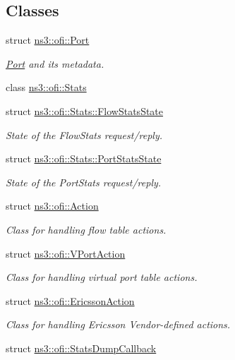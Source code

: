 \subsection*{Classes}
\begin{DoxyCompactItemize}
\item 
struct \hyperlink{structns3_1_1ofi_1_1Port}{ns3\+::ofi\+::\+Port}
\begin{DoxyCompactList}\small\item\em \hyperlink{structns3_1_1ofi_1_1Port}{Port} and its metadata. \end{DoxyCompactList}\item 
class \hyperlink{classns3_1_1ofi_1_1Stats}{ns3\+::ofi\+::\+Stats}
\item 
struct \hyperlink{structns3_1_1ofi_1_1Stats_1_1FlowStatsState}{ns3\+::ofi\+::\+Stats\+::\+Flow\+Stats\+State}
\begin{DoxyCompactList}\small\item\em State of the Flow\+Stats request/reply. \end{DoxyCompactList}\item 
struct \hyperlink{structns3_1_1ofi_1_1Stats_1_1PortStatsState}{ns3\+::ofi\+::\+Stats\+::\+Port\+Stats\+State}
\begin{DoxyCompactList}\small\item\em State of the Port\+Stats request/reply. \end{DoxyCompactList}\item 
struct \hyperlink{structns3_1_1ofi_1_1Action}{ns3\+::ofi\+::\+Action}
\begin{DoxyCompactList}\small\item\em Class for handling flow table actions. \end{DoxyCompactList}\item 
struct \hyperlink{structns3_1_1ofi_1_1VPortAction}{ns3\+::ofi\+::\+V\+Port\+Action}
\begin{DoxyCompactList}\small\item\em Class for handling virtual port table actions. \end{DoxyCompactList}\item 
struct \hyperlink{structns3_1_1ofi_1_1EricssonAction}{ns3\+::ofi\+::\+Ericsson\+Action}
\begin{DoxyCompactList}\small\item\em Class for handling Ericsson Vendor-\/defined actions. \end{DoxyCompactList}\item 
struct \hyperlink{structns3_1_1ofi_1_1StatsDumpCallback}{ns3\+::ofi\+::\+Stats\+Dump\+Callback}

\end{DoxyCompactItemize}
